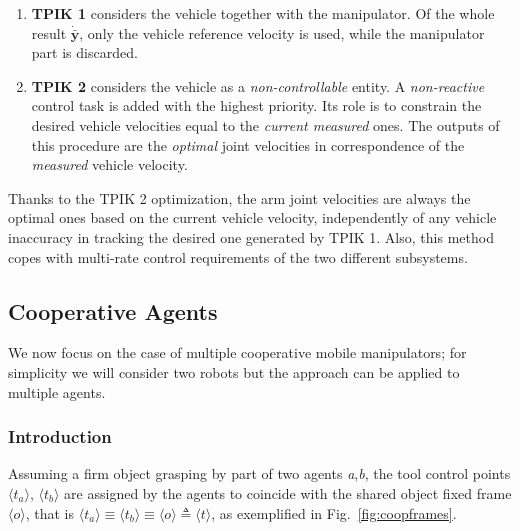 \documentclass[a4paper, 12pt, notitlepage]{article}
\begin{document}
\begin{multicols}{2}
		\begin{enumerate}[leftmargin=*]
			\item \textbf{TPIK 1} considers the vehicle together with the manipulator. Of the whole result $\dot{\bar{\boldsymbol{y}}}$,
			only the vehicle reference velocity is used, while the
			manipulator part is discarded.
			\item \textbf{TPIK 2} considers the vehicle
			as a \textit{non-controllable} entity. A \textit{non-reactive} control task is added with the highest priority. Its role is to constrain the desired vehicle velocities equal to the \textit{current measured} ones. The outputs of this procedure are the \textit{optimal} joint velocities in correspondence of the \textit{measured} vehicle velocity.
		\end{enumerate}
		\vspace{-2px}
		Thanks to the TPIK 2 optimization, the arm joint velocities are always the optimal ones based on the current vehicle velocity, independently of any vehicle inaccuracy in tracking the desired one generated by TPIK 1.
		Also, this method copes with multi-rate control requirements of the two different subsystems.		
		
		\subsection{Cooperative Agents} \label{subsec:coopagents}
		\hspace{7px} We now focus on the case of multiple cooperative mobile manipulators; for simplicity we will consider two robots but the approach can be applied to multiple agents.
		
		\subsubsection{Introduction}
		\hspace{7px} Assuming a firm object grasping by part of two agents \textit{a},\textit{b}, the tool control points $\langle t_a \rangle$, $\langle t_b \rangle$ are assigned by the agents to coincide with the shared object fixed frame $\langle o \rangle$, that is $\langle t_a \rangle \equiv \langle t_b \rangle \equiv \langle o \rangle \triangleq \langle t \rangle$, as exemplified in Fig.\ \ref{fig:coopframes}.
		 

\end{multicols}
\end{document}
